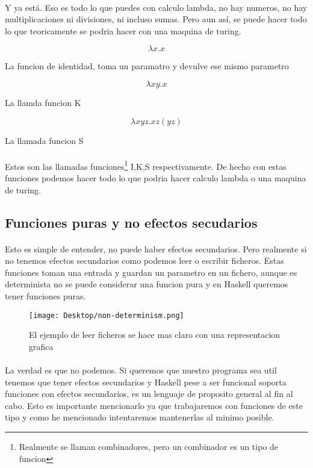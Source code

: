 \documentclass{article}
\begin{document}
			\paragraph{} Y ya está. Eso es todo lo que puedes con calculo lambda, no hay numeros, no hay multiplicaciones ni divisiones, ni incluso sumas. Pero aun así, se puede hacer todo lo que teoricamente se podria hacer con una maquina de turing. 
			\begin{listing}[h]
				\[ 
				\lambda x.x 
				\]
				\caption{La funcion de identidad, toma un paramatro y devulve ese mismo parametro}
			\end{listing}
			\begin{listing}[h]
				\[
				\lambda xy.x
				\]
				\caption{La llamda funcion K}
			\end{listing}
			\begin{listing}[h!]
				\[
				\lambda xyz.xz(yz)
				\]
				\caption{La llamada funcion S}
			\end{listing}
			\paragraph{} Estos son las llamadas funciones\footnote{Realmente se llaman combinadores, pero un combinador es un tipo de funcion} I,K,S respectivamente. De hecho con estas funciones podemos hacer todo lo que podria hacer calculo lambda o una maquina de turing.
		\subsection{Funciones puras y no efectos secudarios}
			\paragraph{} Esto es simple de entender, no puede haber efectos secundarios. Pero realmente si no tenemos efectos secundarios como podemos leer o escribir ficheros. Estas funciones toman una entrada y guardan un parametro en un fichero, aunque es determinista no se puede considerar una funcion pura y en Haskell queremos tener funciones puras.
			\begin{figure}[h]\centering
				\texttt{[image: Desktop/non-determinism.png]}
				\caption{El ejemplo de leer ficheros se hace mas claro con una representacion grafica}
			\end{figure}

			\paragraph{} La verdad es que no podemos. Si queremos que nuestro programa sea util tenemos que tener efectos secundarios y Haskell pese a ser funcional soporta funciones con efectos secundarios, es un lenguaje de proposito general al fin al cabo. Esto es importante mencionarlo ya que trabajaremos con funciones de este tipo y como he mencionado intentaremos mantenerlas al minimo posible.
\end{document}
